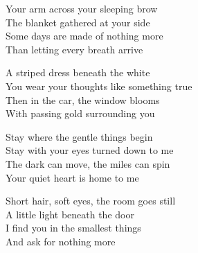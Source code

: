 \begin{lyrics}
Your arm across your sleeping brow\\
The blanket gathered at your side\\
Some days are made of nothing more\\
Than letting every breath arrive

A striped dress beneath the white\\
You wear your thoughts like something true\\
Then in the car, the window blooms\\
With passing gold surrounding you

Stay where the gentle things begin\\
Stay with your eyes turned down to me\\
The dark can move, the miles can spin\\
Your quiet heart is home to me

Short hair, soft eyes, the room goes still\\
A little light beneath the door\\
I find you in the smallest things\\
And ask for nothing more
\end{lyrics}

